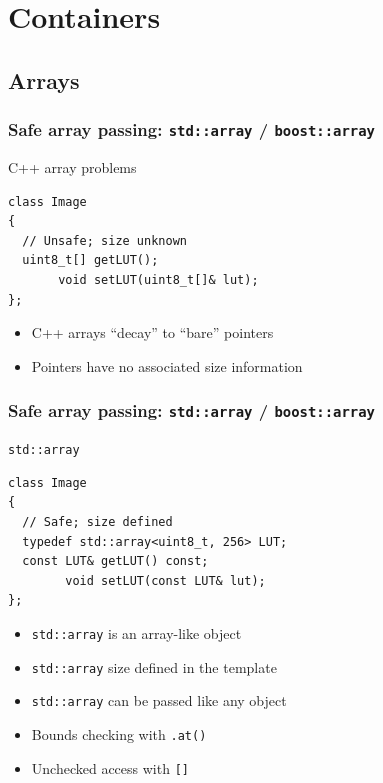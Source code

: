 \documentclass[handout]{beamer}
\begin{document}
\section{Containers}
\subsection{Arrays}
\begin{frame}[fragile]
  \frametitle{Safe array passing: \texttt{std::array} / \texttt{boost::array}}
  \begin{block}{C++ array problems}
  \begin{lstlisting}
class Image
{
  // Unsafe; size unknown
  uint8_t[] getLUT();
       void setLUT(uint8_t[]& lut);
};
\end{lstlisting}
  \begin{itemize}
  \item C++ arrays “decay” to “bare” pointers
  \item Pointers have no associated size information
  \end{itemize}
  \end{block}
\end{frame}

\begin{frame}[fragile]
  \frametitle{Safe array passing: \texttt{std::array} / \texttt{boost::array}}
  \begin{block}{\texttt{std::array}}
  \begin{lstlisting}
class Image
{
  // Safe; size defined
  typedef std::array<uint8_t, 256> LUT;
  const LUT& getLUT() const;
        void setLUT(const LUT& lut);
};
\end{lstlisting}
  \begin{itemize}
  \item<1-> \texttt{std::array} is an array-like object
  \item<2-> \texttt{std::array} size defined in the template
  \item<3-> \texttt{std::array} can be passed like any object
  \item<4-> Bounds checking with \texttt{.at()}
  \item<4-> Unchecked access with \texttt{[]}
  \end{itemize}
  \end{block}
\end{frame}
\end{document}
